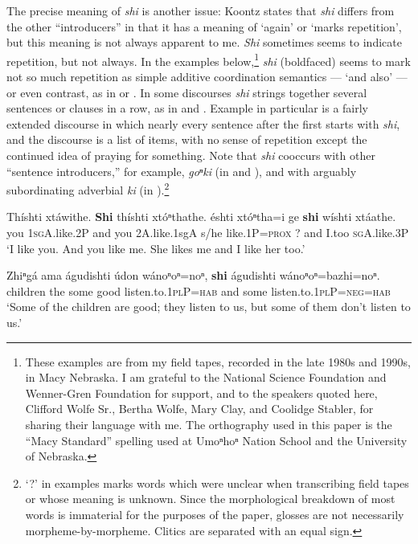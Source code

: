 \documentclass[output=paper]{LSP/langsci}
\begin{document}
The precise meaning of \textit{shi} is another issue:  Koontz states that \textit{shi} differs from the other ``introducers'' in that it has a meaning of `again' or `marks repetition', but this meaning is not always apparent to me. \textit{Shi} sometimes seems to indicate repetition, but not always.  In the examples below,\footnote{These examples are from my field tapes, recorded in the late 1980s and 1990s, in Macy Nebraska. I am grateful to the National Science Foundation and Wenner-Gren Foundation for support, and to the speakers quoted here, Clifford Wolfe Sr., Bertha Wolfe, Mary Clay, and Coolidge Stabler, for sharing their language with me. The orthography used in this paper is the ``Macy Standard'' spelling used at Umoⁿhoⁿ Nation School and the University of Nebraska.}   \textit{shi} (boldfaced) seems to mark not so much repetition as simple additive coordination semantics --- `and also' --- or even contrast, as in  or .  In some discourses \textit{shi} strings together several sentences or clauses in a row, as in  and .  Example  in particular is a fairly extended discourse in which nearly every sentence after the first starts with \textit{shi}, and the discourse is a list of items, with no sense of repetition except the continued idea of praying for something. Note that \textit{shi} cooccurs with other ``sentence introducers,'' for example, \textit{goⁿki} (in  and ), and with arguably subordinating adverbial \textit{ki} (in ).\footnote{`?' in examples marks words which were unclear when transcribing field tapes or whose meaning is unknown. Since the morphological breakdown of most words is immaterial for the purposes of the paper, glosses are not necessarily morpheme-by-morpheme. Clitics are separated with an equal sign.}

\ea \label{ex:rudin:7}
\gll Thíshti  xtáwithe.  \textbf{Shi} thíshti xtóⁿthathe.  éshti  xtóⁿtha=i  ge \textbf{shi}  wíshti xtáathe.\\
 	you   	\textsc{1sgA}.like.2P  and 	you     	2A.like.{1sgA}  	s/he   	like.1P=\textsc{prox}  	?  	and  	I.too  	\textsc{sgA}.like.3P\\
\trans `I like you.  And you like me.  She likes me and I like her too.'

\ex\label{ex:rudin:8} 
\gll  Zhiⁿgá  ama águdishti údon  wánoⁿoⁿ=noⁿ, \textbf{shi}  águdishti  wánoⁿoⁿ=bazhi=noⁿ.\\
children 	the 	some        	good  	listen.to.\textsc{1plP=hab} 	and some listen.to.\textsc{1plP}=\textsc{neg=hab}\\
\trans `Some of the children are good; they listen to us, but some of them don't listen to us.'
\end{document}
